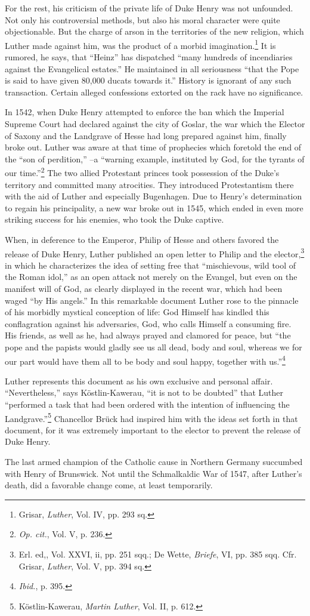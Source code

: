 For the rest, his criticism of the private life of Duke Henry was
not unfounded. Not only his controversial methods, but also his
moral character were quite objectionable. But the charge of arson in
the territories of the new religion, which Luther made against him,
was the product of a morbid imagination.\footnote{Grisar, \textit{Luther}, Vol. IV, pp. 293 sq.}
 It is rumored, he says, that
“Heinz” has dispatched “many hundreds of incendiaries against the
Evangelical estates.” He maintained in all seriousness “that the Pope
is said to have given 80,000 ducats towards it.” History is ignorant
of any such transaction. Certain alleged confessions extorted on the
rack have no significance.

In 1542, when Duke Henry attempted to enforce the ban which
the Imperial Supreme Court had declared against the city of Goslar,
the war which the Elector of Saxony and the Landgrave of Hesse had
long prepared against him, finally broke out. Luther was aware at
that time of prophecies which foretold the end of the “son of perdition,”
--a “warning example, instituted by God, for the tyrants
of our time.”\footnote{\textit{Op. cit.}, Vol. V, p. 236.}
 The two allied Protestant princes took possession of
the Duke’s territory and committed many atrocities. They introduced
Protestantism there with the aid of Luther and especially Bugenhagen.
Due to Henry’s determination to regain his principality, a new war
broke out in 1545, which ended in even more striking success for his
enemies, who took the Duke captive.

When, in deference to the Emperor, Philip of Hesse and others
favored the release of Duke Henry, Luther published an open letter
to Philip and the elector,\footnote
{Erl. ed,, Vol. XXVI, ii, pp. 251 sqq.; De Wette, \textit{Briefe}, VI, pp. 385 sqq. Cfr. Grisar,
\textit{Luther}, Vol. V, pp. 394 sq.}
in which he characterizes the idea of
setting free that “mischievous, wild tool of the Roman idol,” as an
open attack not merely on the Evangel, but even on the manifest will of
God, as clearly displayed in the recent war, which had
been waged “by His angels.” In this remarkable document Luther
rose to the pinnacle of his morbidly mystical conception of life: God
Himself has kindled this conflagration against his adversaries, God,
who calls Himself a consuming fire. His friends, as well as he, had
always prayed and clamored for peace, but “the pope and the papists
would gladly see us all dead, body and soul, whereas we for our part
would have them all to be body and soul happy, together with us.”\footnote{\textit{Ibid.}, p. 395.}

Luther represents this document as his own exclusive and personal affair.
“Nevertheless,” says Köstlin-Kawerau, “it is not to be doubted”
that Luther “performed a task that had been ordered with the intention
of influencing the Landgrave.”\footnote{Köstlin-Kawerau, \textit{Martin Luther}, Vol. II, p. 612.}
Chancellor Brück had inspired
him with the ideas set forth in that document, for it was extremely important
to the elector to prevent the release of Duke Henry.

The last armed champion of the Catholic cause in Northern Germany succumbed
with Henry of Brunswick. Not until the Schmalkaldic War of 1547, after
Luther’s death, did a favorable change
come, at least temporarily.
